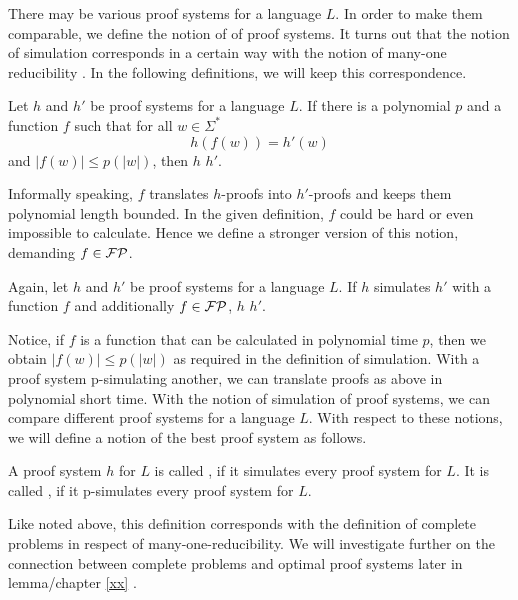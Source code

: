   There may be various proof systems for a language \(L\). In order to make them comparable, we define the notion of  of proof systems. It turns out that the notion of simulation corresponds in a certain way with the notion of many-one reducibility \cite{KM00}. In the following definitions, we will keep this correspondence.
  
  \begin{definition}
    Let \(h\) and \(h'\) be proof systems for a language \(L\). If there is a polynomial \(p\) and a function \(f\) such that for all \(w \in \Sigma^*\)
      \[
        h(f(w)) = h'(w)
      \]
    and \(|f(w)| \leq p(|w|)\), then \(h\)  \(h'\).
  \end{definition}

  Informally speaking, \(f\) translates \(h\)-proofs into \(h'\)-proofs and keeps them polynomial length bounded. In the given definition, \(f\) could be hard or even impossible to calculate. Hence we define a stronger version of this notion, demanding \(f \in \mathcal{FP}\).

  \begin{definition}
   Again, let \(h\) and \(h'\) be proof systems for a language \(L\). If \(h\) simulates \(h'\) with a function \(f\) and additionally \(f \in \mathcal{FP}\), \(h\)  \(h'\).
  \end{definition}

  Notice, if \(f\) is a function that can be calculated in polynomial time \(p\), then we obtain \(|f(w)| \leq p(|w|)\) as required in the definition of simulation. With a proof system p-simulating another, we can translate proofs as above in polynomial short time. With the notion of simulation of proof systems, we can compare different proof systems for a language \(L\). With respect to these notions, we will define a notion of the best proof system as follows.

  \begin{definition}
    A proof system \(h\) for \(L\) is called , if it simulates every proof system for \(L\). It is called , if it p-simulates every proof system for \(L\).
  \end{definition}

  Like noted above, this definition corresponds with the definition of complete problems in respect of many-one-reducibility. We will investigate further on the connection between complete problems and optimal proof systems later in lemma/chapter \ref{xx} \cite{KMT03}.

